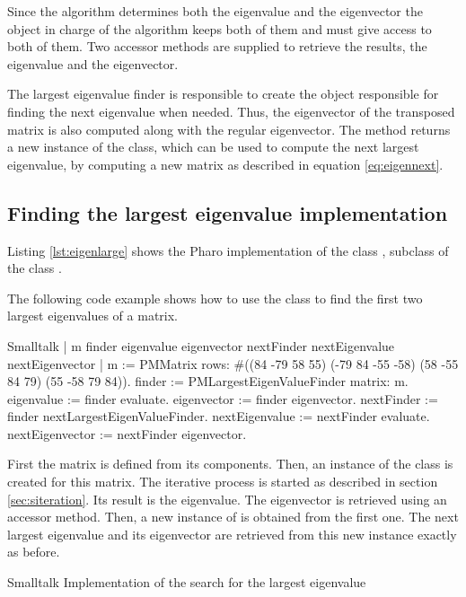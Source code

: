 Since the algorithm determines both the eigenvalue and the
eigenvector the object in charge of the algorithm keeps both of
them and must give access to both of them. Two accessor methods
are supplied to retrieve the results, the eigenvalue and the
eigenvector.

The largest eigenvalue finder is responsible to create the object
responsible for finding the next eigenvalue when needed. Thus, the
eigenvector of the transposed matrix is also computed along with
the regular eigenvector. The method  returns a new instance of the class,
which can be used to compute the next largest eigenvalue, by
computing a new matrix as described in equation
\ref{eq:eigennext}.

\subsection{Finding the largest eigenvalue implementation}
Listing \ref{lst:eigenlarge} shows the Pharo implementation of the class , subclass of the class .

The following code example shows how to use the class to find the
first two largest eigenvalues of a matrix.
\begin{displaycode}{Smalltalk}
 | m finder eigenvalue eigenvector nextFinder nextEigenvalue nextEigenvector |
 m := PMMatrix rows: #((84 -79 58 55)
                        (-79 84 -55 -58)
                        (58 -55 84 79)
                        (55 -58 79 84)).
 finder := PMLargestEigenValueFinder matrix: m.
 eigenvalue := finder evaluate.
 eigenvector := finder eigenvector.
 nextFinder := finder nextLargestEigenValueFinder.
 nextEigenvalue := nextFinder evaluate.
 nextEigenvector := nextFinder eigenvector.
\end{displaycode}
First the matrix  is defined from its components. Then, an
instance of the class  is created
for this matrix. The iterative process is started as described in
section \ref{sec:siteration}. Its result is the eigenvalue. The
eigenvector is retrieved using an accessor method. Then, a new
instance of  is obtained from the
first one. The next largest eigenvalue and its eigenvector are
retrieved from this new instance exactly as before.

\begin{listing}[label=lst:eigenlarge]{Smalltalk}
{Implementation of the search for the largest eigenvalue}
%
\end{listing}

